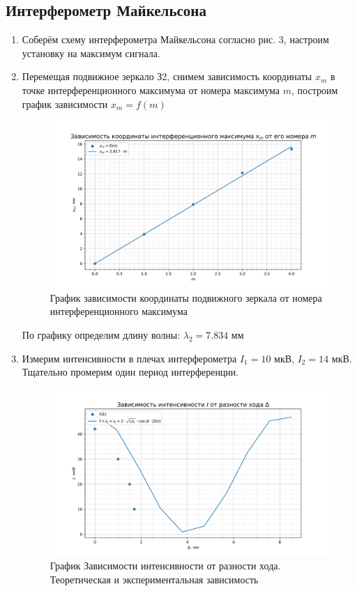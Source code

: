 \documentclass[a4paper, 12pt]{article}
\begin{document}
\subsection{Интерферометр Майкельсона}
\begin{enumerate}
    \item Соберём схему интерферометра Майкельсона согласно рис. 3, настроим установку на максимум сигнала. 
    \item Перемещая подвижное зеркало З2, снимем зависимость координаты $x_m$ в точке интерференционного максимума от номера максимума $m$, построим график зависимости $x_m = f(m)$

    \begin{figure}[h!]
        \centering
        \includegraphics[scale=0.7]{4.6.1_3.png}
        \caption{График зависимости координаты подвижного зеркала от номера интерференционного максимума}
        \label{fig:interfmax}
    \end{figure}

    По графику определим длину волны: $\lambda_2 = 7.834$ мм

    \item Измерим интенсивности в плечах интерферометра $I_1 = 10$ мкВ, $I_2 = 14$ мкВ. Тщательно промерим один период интерференции.

    \begin{figure}[h!]
        \centering
        \includegraphics[scale=0.7]{4.6.1_4.png}
        \caption{График Зависимости интенсивности от разности хода. Теоретическая и экспериментальная зависимость}
        \label{fig:diff}
    \end{figure}


\end{enumerate}
\end{document}
